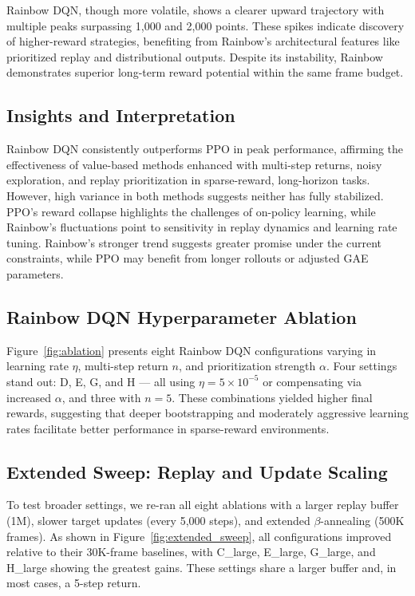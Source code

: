 \documentclass{article}
\begin{document}
Rainbow DQN, though more volatile, shows a clearer upward trajectory with multiple peaks surpassing 1,000 and 2,000 points. These spikes indicate discovery of higher-reward strategies, benefiting from Rainbow’s architectural features like prioritized replay and distributional outputs. Despite its instability, Rainbow demonstrates superior long-term reward potential within the same frame budget.

\subsection{Insights and Interpretation}

Rainbow DQN consistently outperforms PPO in peak performance, affirming the effectiveness of value-based methods enhanced with multi-step returns, noisy exploration, and replay prioritization in sparse-reward, long-horizon tasks. However, high variance in both methods suggests neither has fully stabilized. PPO’s reward collapse highlights the challenges of on-policy learning, while Rainbow’s fluctuations point to sensitivity in replay dynamics and learning rate tuning. Rainbow’s stronger trend suggests greater promise under the current constraints, while PPO may benefit from longer rollouts or adjusted GAE parameters.

\subsection{Rainbow DQN Hyperparameter Ablation}

Figure~\ref{fig:ablation} presents eight Rainbow DQN configurations varying in learning rate \(\eta\), multi-step return \(n\), and prioritization strength \(\alpha\). Four settings stand out: D, E, G, and H — all using \(\eta = 5 \times 10^{-5}\) or compensating via increased \(\alpha\), and three with \(n = 5\). These combinations yielded higher final rewards, suggesting that deeper bootstrapping and moderately aggressive learning rates facilitate better performance in sparse-reward environments.

\subsection{Extended Sweep: Replay and Update Scaling}

To test broader settings, we re-ran all eight ablations with a larger replay buffer (1M), slower target updates (every 5,000 steps), and extended \(\beta\)-annealing (500K frames). As shown in Figure~\ref{fig:extended_sweep}, all configurations improved relative to their 30K-frame baselines, with C\_large, E\_large, G\_large, and H\_large showing the greatest gains. These settings share a larger buffer and, in most cases, a 5-step return.
\end{document}
